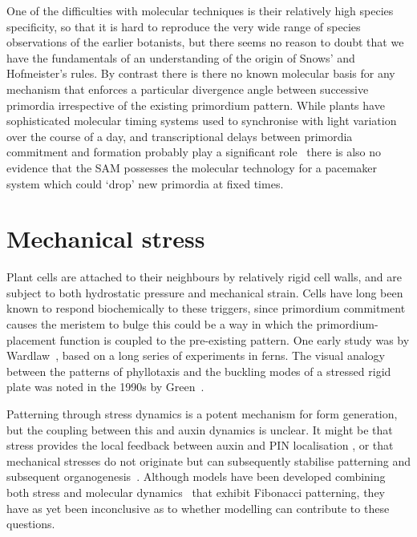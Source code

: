One of the difficulties with molecular techniques is their relatively high species specificity, so that it is hard to reproduce the very wide range of species observations of the earlier botanists, but there seems no reason to doubt that we have the fundamentals of an understanding of the origin of Snows' and Hofmeister's rules. By contrast there is there no known molecular basis  for any mechanism that enforces a particular divergence angle between successive primordia irrespective of the existing primordium pattern. While plants have sophisticated molecular timing systems used to synchronise with light variation over the course of a day, and transcriptional  delays between primordia commitment and formation probably play a significant role~\autocite{galvan-ampudiaTemporalIntegrationAuxin2020}
 there is also no evidence that the SAM possesses the molecular technology for a pacemaker system which could `drop' new primordia at fixed times. 

\section{Mechanical stress}

 Plant cells are attached to their neighbours by relatively rigid cell walls, and are subject to both hydrostatic pressure and mechanical strain. Cells have long been known to respond biochemically to these triggers, since primordium commitment causes the meristem to bulge this could be a way in which the primordium-placement function is coupled to the pre-existing pattern. 
 One early study was by Wardlaw~\autocite{wardlawPhyllotaxisOrganogenesisFerns1949}, based on a long series of experiments in ferns.  The visual analogy between the patterns of phyllotaxis and the buckling modes of a stressed rigid plate was noted in the 1990s by Green~\cite{greenPhyllotacticPatternsCharacterization1987}.  
 
  Patterning through stress dynamics is a potent mechanism for form generation,  but the coupling between this and auxin dynamics is unclear.  It might be that stress provides the local feedback between auxin and PIN localisation \autocite{heislerAlignmentPIN1Polarity2010},
   or that mechanical stresses do not originate but can subsequently stabilise patterning and  subsequent organogenesis~\autocite{kuhlemeierPhyllotaxis2017}.  Although models have been developed combining both stress and molecular dynamics~\autocite{pennybackerPhyllotaxisProgressStory2015} that exhibit Fibonacci patterning, they have as yet been inconclusive as to whether modelling can contribute to  these questions.
 
